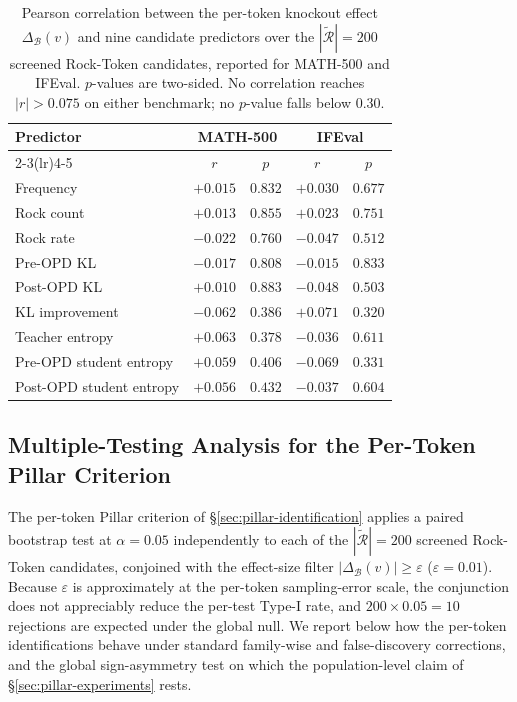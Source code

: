 \begin{table}[h]
\centering
\caption{Pearson correlation between the per-token knockout effect $\Delta_{\mathcal{B}}(v)$ and nine candidate predictors over the $|\widetilde{\mathcal{R}}|=200$ screened Rock-Token candidates, reported for MATH-500 and IFEval. $p$-values are two-sided. No correlation reaches $|r|>0.075$ on either benchmark; no $p$-value falls below $0.30$.}
\label{tab:pillar-correlations}
\small
\begin{tabular}{lcccc}
\toprule
\textbf{Predictor} & \multicolumn{2}{c}{\textbf{MATH-500}} & \multicolumn{2}{c}{\textbf{IFEval}} \\
\cmidrule(lr){2-3}\cmidrule(lr){4-5}
 & $r$ & $p$ & $r$ & $p$ \\
\midrule
Frequency                  & $+0.015$ & $0.832$ & $+0.030$ & $0.677$ \\
Rock count                 & $+0.013$ & $0.855$ & $+0.023$ & $0.751$ \\
Rock rate                  & $-0.022$ & $0.760$ & $-0.047$ & $0.512$ \\
Pre-OPD KL                 & $-0.017$ & $0.808$ & $-0.015$ & $0.833$ \\
Post-OPD KL                & $+0.010$ & $0.883$ & $-0.048$ & $0.503$ \\
KL improvement             & $-0.062$ & $0.386$ & $+0.071$ & $0.320$ \\
Teacher entropy            & $+0.063$ & $0.378$ & $-0.036$ & $0.611$ \\
Pre-OPD student entropy    & $+0.059$ & $0.406$ & $-0.069$ & $0.331$ \\
Post-OPD student entropy   & $+0.056$ & $0.432$ & $-0.037$ & $0.604$ \\
\bottomrule
\end{tabular}
\end{table}

\subsection{Multiple-Testing Analysis for the Per-Token Pillar Criterion}
\label{app:pillar_multiple_testing}

The per-token Pillar criterion of \S\ref{sec:pillar-identification} applies a paired bootstrap test at $\alpha=0.05$ independently to each of the $|\widetilde{\mathcal{R}}|=200$ screened Rock-Token candidates, conjoined with the effect-size filter $|\Delta_\mathcal{B}(v)|\ge\varepsilon$ ($\varepsilon=0.01$). Because $\varepsilon$ is approximately at the per-token sampling-error scale, the conjunction does not appreciably reduce the per-test Type-I rate, and $200\!\times\!0.05 = 10$ rejections are expected under the global null. We report below how the per-token identifications behave under standard family-wise and false-discovery corrections, and the global sign-asymmetry test on which the population-level claim of \S\ref{sec:pillar-experiments} rests.

